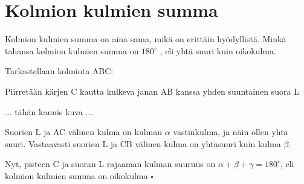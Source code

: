 \section*{Kolmion kulmien summa}

Kolmion kulmien summa on aina sama, mikä on erittäin hyödyllistä. Minkä tahansa kolmion kulmien summa on $ 180^{\circ}$ , eli yhtä suuri kuin oikokulma.

Tarkastellaan kolmiota ABC:

Piirretään kärjen C kautta kulkeva janan AB kanssa yhden suuntainen suora L

... tähän kaunis kuva ...

Suorien L ja AC välinen kulma on kulman $ {\alpha}$ vastinkulma, ja näin ollen yhtä suuri.
Vastaavasti suorien L ja CB välinen kulma on yhtäsuuri kuin kulma $ {\beta}$.

Nyt, pisteen C ja suoran L rajaaman kulman suuruus on $ {\alpha + \beta + \gamma = 180^\circ} $, eli kolmion kulmien summa on oikokulma ${\square}$
 



 